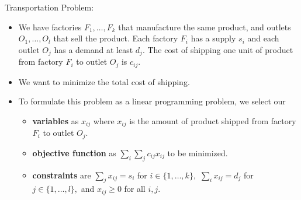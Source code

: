 \documentclass[a4paper,12pt]{article}
\begin{document}
Transportation Problem:
\begin{itemize}
    \item We have factories $F_1,\dots,F_k$ that manufacture the same product, and outlets $O_1,\dots,O_l$ that sell the product. Each factory $F_i$ has a supply $s_i$ and each outlet $O_j$ has a demand at least $d_j.$ The cost of shipping one unit of product from factory $F_i$ to outlet $O_j$ is $c_{ij}.$
    \item We want to minimize the total cost of shipping.
    \item To formulate this problem as a linear programming problem, we select our \begin{itemize}
        \item \textbf{variables} as $x_{ij}$ where $x_{ij}$ is the amount of product shipped from factory $F_i$ to outlet $O_j.$ 
        \item \textbf{objective function} as $\sum_i\sum_jc_{ij}x_{ij}$ to be minimized.
        \item \textbf{constraints} are $\sum_jx_{ij}=s_i$ for $i\in\{1,\dots,k\},$ $\sum_ix_{ij}=d_j$ for $j\in\{1,\dots,l\},$ and $x_{ij}\geq 0$ for all $i,j.$
    \end{itemize}
\end{itemize}
\end{document}
